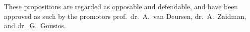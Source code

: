 \documentclass{dissertation}
\begin{document}
\bigskip
\bigskip

\begin{center}
These propositions are regarded as opposable and defendable, and have been approved as such by the
promotors prof.\ dr.\ A.\ van Deursen, dr.\ A.\ Zaidman, and dr.\ G.\ Gousios.
\end{center}




















\end{document}
